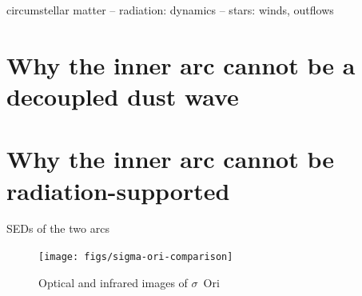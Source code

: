 \documentclass[useAMS, usenatbib, a4paper]{mnras}
\title
{\boldmath A dusty bow shock around \(\sigma\) Orionis driven by an enclosed proplyd?}
\author[Henney \& Arthur]{
  William J. Henney \& S. Jane Arthur\\
  \AddressCRyA
}
\date{Accepted XXX. Received YYY; in original form ZZZ}
\newcommand\hii{\ion{H}{ii}}
\begin{document}
\label{firstpage}
\pagerange{\pageref{firstpage}--\pageref{lastpage}}
\maketitle
\begin{abstract}
  We critically evaluate the role of radiation and hydrodynamics in
  providing internal support for the bow-shaped infrared arc around
  the massive triple star system \(\sigma\)~Ori Aa/Ab/B in the IC434 \hii{}
  region.  We present evidence for hydrogen recombination line
  emission from the arc, which demonstrates that it cannot be a
  decoupled dust wave, as has previously been claimed.  On the other
  hand, we show that the fraction of the stellar luminosity trapped by
  the arc is insufficient for it to be supported by radiation if the
  grains and gas are well coupled.  Therefore, the arc must be
  supported by the ram pressure of an internal wind.  However, the
  stellar winds from the OB stars in the \(\sigma\)~Ori Aa/Ab/B system seem
  too weak to provide this support on their own.  We propose instead
  that it is the photoevaporated disk wind from the enclosed proplyd
  IRS~1B that dominates the ram pressure support for the bow.
\end{abstract}

\begin{keywords}
  circumstellar matter -- radiation: dynamics -- stars: winds, outflows
\end{keywords}

\section{Why the inner arc cannot be a decoupled dust wave}
\label{sec:why-not-dust}

\section{Why the inner arc cannot be radiation-supported}
\label{sec:why-not-radiation}

SEDs of the two arcs

\begin{figure}
  \centering
  \texttt{[image: figs/sigma-ori-comparison]}
  \caption{Optical and infrared images of $\sigma$~Ori}
  \label{fig:sig-ori}
\end{figure}
\end{document}
